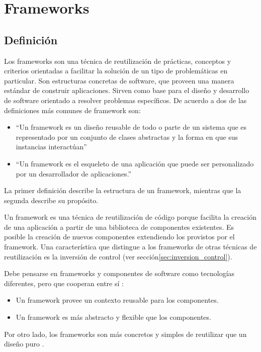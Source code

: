 
\section{Frameworks}


\subsection{Definición}

Los frameworks son una técnica de reutilización de prácticas, conceptos y
criterios orientadas a facilitar la solución de un tipo de problemáticas en
particular. Son estructuras concretas de software, que proveen una manera
estándar de construir aplicaciones. Sirven como base para el diseño y
desarrollo de software orientado a resolver problemas específicos.
De acuerdo a \cite{Johnson97} dos de las definiciones más comunes de framework
son:
\begin{itemize}
  \item ``Un framework es un diseño reusable de todo o parte de un sistema que es
  representado por un conjunto de clases abstractas y la forma en que sus
  instancias interactúan''
  \item ``Un framework es el esqueleto de una aplicación que puede ser
  personalizado por un desarrollador de aplicaciones.''
\end{itemize} 

 La primer definición describe la estructura de un framework, mientras que la
 segunda describe su propósito.

Un framework es una técnica de reutilización de código porque facilita la
creación de una aplicación a partir de una biblioteca de componentes existentes.
Es posible la creación de nuevos componentes extendiendo los provistos por el
framework. Una característica que distingue a los frameworks de otras
técnicas de reutilización es la inversión de control (ver
sección\ref{sec:inversion_control}).

Debe pensarse en frameworks y componentes de software como tecnologías
diferentes, pero que cooperan entre sí \cite{JohnsonFeb97}:
\begin{itemize}
  \item Un framework provee un contexto reusable para los componentes.
  \item Un framework es más abstracto y flexible que los componentes.
\end{itemize} 

Por otro lado, los frameworks son más concretos y simples de reutilizar
que un diseño puro \cite{JohnsonFeb97}.

